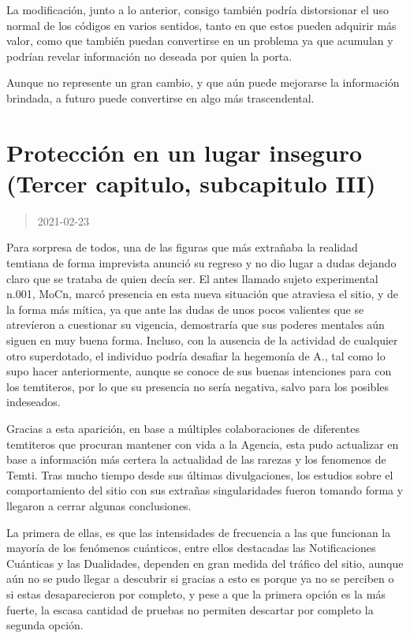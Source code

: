 \documentclass[
  spanish,
]{book}
\begin{document}
La modificación, junto a lo anterior, consigo también podría distorsionar el uso normal de los códigos en varios sentidos, tanto en que estos pueden adquirir más valor, como que también puedan convertirse en un problema ya que acumulan y podrían revelar información no deseada por quien la porta.

Aunque no represente un gran cambio, y que aún puede mejorarse la información brindada, a futuro puede convertirse en algo más trascendental.

\hypertarget{protecciuxf3n-en-un-lugar-inseguro-tercer-capitulo-subcapitulo-iii}{%
\section{Protección en un lugar inseguro (Tercer capitulo, subcapitulo III)}\label{protecciuxf3n-en-un-lugar-inseguro-tercer-capitulo-subcapitulo-iii}}

\begin{quote}
2021-02-23
\end{quote}

Para sorpresa de todos, una de las figuras que más extrañaba la realidad temtiana de forma imprevista anunció su regreso y no dio lugar a dudas dejando claro que se trataba de quien decía ser. El antes llamado sujeto experimental n.001, MoCn, marcó presencia en esta nueva situación que atraviesa el sitio, y de la forma más mítica, ya que ante las dudas de unos pocos valientes que se atrevíeron a cuestionar su vigencia, demostraría que sus poderes mentales aún siguen en muy buena forma. Incluso, con la ausencia de la actividad de cualquier otro superdotado, el individuo podría desafiar la hegemonía de A., tal como lo supo hacer anteriormente, aunque se conoce de sus buenas intenciones para con los temtiteros, por lo que su presencia no sería negativa, salvo para los posibles indeseados.

Gracias a esta aparición, en base a múltiples colaboraciones de diferentes temtiteros que procuran mantener con vida a la Agencia, esta pudo actualizar en base a información más certera la actualidad de las rarezas y los fenomenos de Temti. Tras mucho tiempo desde sus últimas divulgaciones, los estudios sobre el comportamiento del sitio con sus extrañas singularidades fueron tomando forma y llegaron a cerrar algunas conclusiones.

La primera de ellas, es que las intensidades de frecuencia a las que funcionan la mayoría de los fenómenos cuánticos, entre ellos destacadas las Notificaciones Cuánticas y las Dualidades, dependen en gran medida del tráfico del sitio, aunque aún no se pudo llegar a descubrir si gracias a esto es porque ya no se perciben o si estas desaparecieron por completo, y pese a que la primera opción es la más fuerte, la escasa cantidad de pruebas no permiten descartar por completo la segunda opción.
\end{document}
